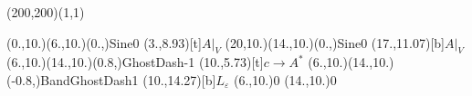 \unitlength=1bp%

\begin{feynartspicture}(200,200)(1,1)

\FADiagram{}
\FAProp(0.,10.)(6.,10.)(0.,){Sine}{0}
\FALabel(3.,8.93)[t]{$A|_V$}
\FAProp(20,10.)(14.,10.)(0.,){Sine}{0}
\FALabel(17.,11.07)[b]{$A|_V$}
\FAProp(6.,10.)(14.,10.)(0.8,){GhostDash}{-1}
\FALabel(10.,5.73)[t]{$c\to A^*$}
\FAProp(6.,10.)(14.,10.)(-0.8,){BandGhostDash}{1}
\FALabel(10.,14.27)[b]{$L_\varepsilon$}
\FAVert(6.,10.){0}
\FAVert(14.,10.){0}
\end{feynartspicture}

